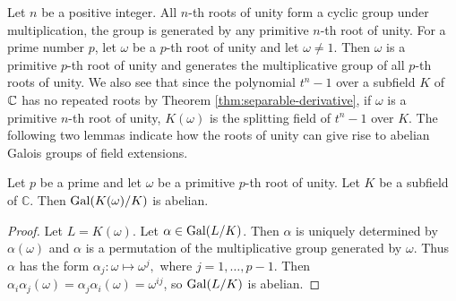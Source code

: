 Let $n$ be a positive integer. All $n$-th roots of unity form a cyclic group under multiplication, the group is generated by any primitive $n$-th root of unity. For a prime number $p$, let $\omega$ be a $p$-th root of unity and let $\omega \neq 1$. Then $\omega$ is a primitive $p$-th root of unity and generates the multiplicative group of all $p$-th roots of unity. We also see that since the polynomial $t^n - 1$ over a subfield $K$ of $\mathbb C$ has no repeated roots by Theorem \ref{thm:separable-derivative}, if $\omega$ is a primitive $n$-th root of unity, $K(\omega)$ is the splitting field of $t^n - 1$ over $K$. The following two lemmas indicate how the roots of unity can give rise to abelian Galois groups of field extensions. 



%




\begin{lemma} \label{thm:radical-1}
	Let $p$ be a prime and let $\omega$ be a primitive $p$-th root of unity. Let $K$ be a subfield of $\mathbb C$. Then $\operatorname{Gal}(K(\omega) / K)$ is abelian.
\end{lemma}
\begin{proof}
	Let $L = K(\omega)$.  Let $\alpha \in \operatorname{Gal}(L / K)$. Then $\alpha$ is uniquely determined by $\alpha(\omega)$ and $\alpha$ is a permutation of the multiplicative group generated by $\omega$. Thus $\alpha$ has the form
	$
	\alpha_j: \omega \mapsto \omega^j,
	$
	where $j=1,\dots,p-1$. Then $\alpha_i \alpha_j (\omega) = \alpha_j \alpha_i (\omega) = \omega^{i j}$, so $ \operatorname{Gal}(L / K)$ is abelian.	
\end{proof}

